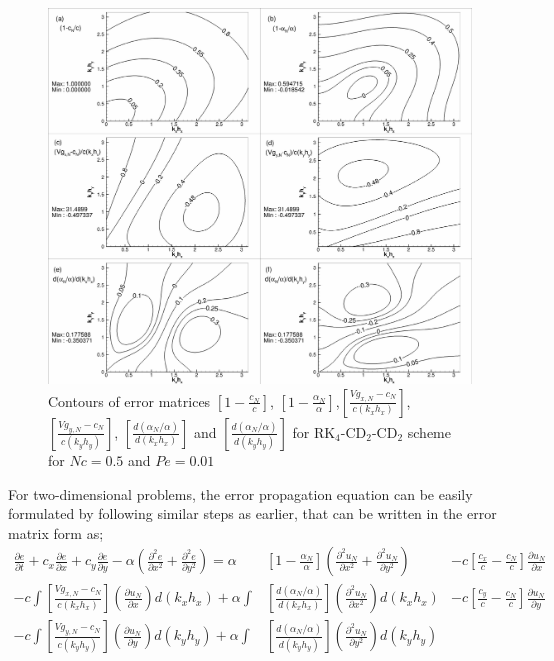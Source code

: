 \documentclass[showpacs,preprintnumbers,amsmath,amssymb]{revtex4-1} %
\begin{document}
\begin{figure}[h]
\begin{center}
\includegraphics[width=\textwidth]{err_mat_cd2_cd2.pdf}
\end{center}    
\raggedleft
\caption{Contours of error matrices $\left[1-\frac{c_N}{c} \right]$, $\left[1-\frac{\alpha_N}{\alpha}\right]$,$\left[\frac{Vg_{x,N}-c_N}{c(k_xh_x)} \right]$, $\left[\frac{Vg_{y,N}-c_N}{c(k_yh_y)} \right]$, $\left[ \frac{d(\alpha_N/\alpha)}{d(k_xh_x)}\right]$ and $\left[ \frac{d(\alpha_N/\alpha)}{d(k_yh_y)}\right]$ for RK$_4$-CD$_2$-CD$_2$ scheme for $Nc=0.5$ and $Pe=0.01$}
\label{fig_wave}
\end{figure}

For two-dimensional problems, the error propagation equation can be easily formulated by following similar steps as earlier, that can be written in the error matrix form as;
\begin{equation}
\begin{aligned}
\frac{\partial e}{\partial t}+c_x\frac{\partial e}{\partial x}+c_y\frac{\partial e}{\partial y}-\alpha\left(\frac{\partial^2 e}{\partial x^2}+ \frac{\partial^2 e}{\partial y^2}\right) = \alpha &\left[ 1-\frac{\alpha_N}{\alpha}\right] \left(\frac{\partial^2 u_N}{\partial x^2} + \frac{\partial^2 u_N}{\partial y^2}\right) & - c \left[\frac{c_x}{c}-\frac{c_N}{c} \right]\frac{\partial u_N}{\partial x} \\- c \int \left[ \frac{Vg_{x,N}-c_N}{c(k_xh_x)} \right] \left( \frac{\partial u_N}{\partial x} \right) d(k_xh_x)+\alpha \int &\left[ \frac{d(\alpha_N/\alpha)}{d(k_xh_x)}\right] \left( \frac{\partial^2 u_N}{\partial x^2} \right) d(k_xh_x) & - c \left[\frac{c_y}{c}-\frac{c_N}{c}\right]\frac{\partial u_N}{\partial y} \\ - c \int \left[\frac{Vg_{y,N}-c_N}{c(k_yh_y)} \right] \left( \frac{\partial u_N}{\partial y} \right) d(k_yh_y)+ \alpha \int & \left[ \frac{d(\alpha_N/\alpha)}{d(k_yh_y)}\right] \left( \frac{\partial^2 u_N}{\partial y^2} \right) d(k_yh_y)
\end{aligned}
\end{equation}
\end{document}
